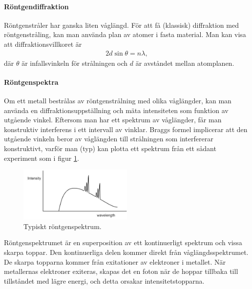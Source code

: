 \paragraph{Röntgendiffraktion}
Röntgenstråler har ganska liten våglängd. För att få (klassisk) diffraktion med röntgenstråling, kan man använda plan av atomer i fasta material. Man kan visa att diffraktionsvillkoret är
\begin{align*}
	2d\sin{\theta} = n\lambda,
\end{align*}
där $\theta$ är infallsvinkeln för strålningen och $d$ är avståndet mellan atomplanen.

\paragraph{Röntgenspektra}
Om ett metall bestrålas av röntgenstrålning med olika våglängder, kan man använda en diffraktionsuppställning och mäta intensiteten som funktion av utgående vinkel. Eftersom man har ett spektrum av våglängder, får man konstruktiv interferens i ett intervall av vinklar. Braggs formel implicerar att den utgående vinkeln beror av våglängden till strålningen som interfererar konstruktivt, varför man (typ) kan plotta ett spektrum från ett sådant experiment som i figur \ref{fig:x-ray_spectrum}.

\begin{figure}[!ht]
	\centering
	\includegraphics[width = 0.5\textwidth]{./Images/x-ray_spectrum.jpg}
	\caption{Typiskt röntgenspektrum.}
	\label{fig:x-ray_spectrum}
\end{figure}

Röntgenspektrumet är en superposition av ett kontinuerligt spektrum och vissa skarpa toppar. Den kontinuerliga delen kommer direkt från våglängdsspektrumet. De skarpa topparna 
kommer från exitationer av elektroner i metallet. När metallernas elektroner exiteras, skapas det en foton när de hoppar tillbaka till tillståndet med lägre energi, och detta orsakar intensitetstopparna.

